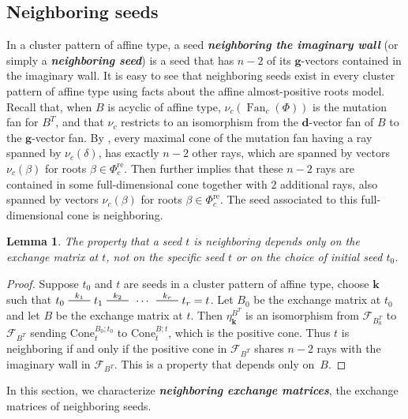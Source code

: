 \documentclass{amsart}
\newtheorem{lemma}[proposition]{Lemma}
\theoremstyle{definition}
\theoremstyle{remark}
\numberwithin{equation}{section}
\newcommand{\newword}[1]{\textbf{\emph{#1}}}
\newcommand{\edge}{\,\,\rule[2.7pt]{20pt}{0.5pt}\,\,}
\newcommand{\F}{{\mathcal F}}
\newcommand{\0}{{\mathbf{0}}}
\newcommand{\Cone}{\mathrm{Cone}}
\newcommand{\g}{\mathbf{g}}
\newcommand{\kk}{{\boldsymbol{k}}}
\newcommand{\Fan}{\operatorname{Fan}}
\newcommand{\re}{\mathrm{re}}
\newcommand{\dd}{{\mathbf d}}
\newcommand{\RSChar}{\Phi}
\newcommand{\RS}{\RSChar}
\newcommand{\AP}[1]{\RS_{#1}}
\newcommand{\APre}[1]{\AP{#1}^\re}
\begin{document}
\subsection{Neighboring seeds}\label{neigh sec}
In a cluster pattern of affine type, a seed \newword{neighboring the imaginary wall} (or simply a \newword{neighboring seed}) is a seed that has $n-2$ of its $\g$-vectors contained in the imaginary wall.
It is easy to see that neighboring seeds exist in every cluster pattern of affine type using facts about the affine almost-positive roots model.
Recall that, when $B$ is acyclic of affine type, $\nu_c(\Fan_c(\RS))$ is the mutation fan for $B^T$, and that $\nu_c$ restricts to an isomorphism from the $\dd$-vector fan of $B$ to the $\g$-vector fan.
By \cite[Proposition~5.14]{affdenom}, every maximal cone of the mutation fan having a ray spanned by $\nu_c(\delta)$, has exactly $n-2$ other rays, which are spanned by vectors $\nu_c(\beta)$ for roots $\beta\in\APre{c}$.
Then \cite[Proposition~5.14]{affdenom} further implies that these $n-2$ rays are contained in some full-dimensional cone together with $2$ additional rays, also spanned by vectors $\nu_c(\beta)$ for roots $\beta\in\APre{c}$.
The seed associated to this full-dimensional cone is neighboring.

\begin{lemma}\label{neigh B only}
The property that a seed $t$ is neighboring depends only on the exchange matrix at $t$, not on the specific seed $t$ or on the choice of initial seed $t_0$.
\end{lemma}
\begin{proof}
Suppose $t_0$ and $t$ are seeds in a cluster pattern of affine type, choose $\kk$ such that $t_0\overset{k_1}{\edge}t_1\overset{k_2}{\edge}\,\cdots\,\overset{k_r}{\edge}t_r=t$.
Let $B_0$ be the exchange matrix at $t_0$ and let $B$ be the exchange matrix at $t$.
Then $\eta^{B^T}_\kk$ is an isomorphism from $\F_{B_0^T}$ to $\F_{B^T}$ sending $\Cone_t^{B_0;t_0}$ to $\Cone_t^{B;t}$, which is the positive cone.
Thus $t$ is neighboring if and only if the positive cone in $\F_{B^T}$ shares $n-2$ rays with the imaginary wall in $\F_{B^T}$.
This is a property that depends only on~$B$.
\end{proof}

In this section, we characterize \newword{neighboring exchange matrices}, the exchange matrices of neighboring seeds.
\end{document}
